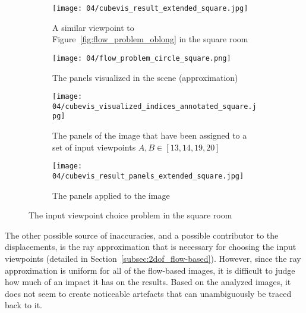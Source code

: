 \begin{figure}[p]
\centering
    \hfill
    \begin{subfigure}[c]{0.45\textwidth}
            \centering
            \texttt{[image: 04/cubevis\_result\_extended\_square.jpg]}
            \caption{A similar viewpoint to Figure~\ref{fig:flow_problem_oblong} in the square room}
    \end{subfigure}
    \hfill
    \begin{subfigure}[c]{0.45\textwidth}
            \centering
            \texttt{[image: 04/flow\_problem\_circle\_square.png]}
            \caption{The panels visualized in the scene (approximation)}
    \end{subfigure}
    \hfill

    \hfill
    \begin{subfigure}[c]{0.45\textwidth}
            \centering
            \texttt{[image: 04/cubevis\_visualized\_indices\_annotated\_square.jpg]}
            \caption{The panels of the image that have been assigned to a set of input viewpoints $A, B \in [13, 14, 19, 20]$}
    \end{subfigure}
    \hfill
    \begin{subfigure}[c]{0.45\textwidth}
            \centering
            \texttt{[image: 04/cubevis\_result\_panels\_extended\_square.jpg]}
            \caption{The panels applied to the image}
    \end{subfigure}
    \hfill
  \caption{The input viewpoint choice problem in the square room}
  \label{fig:flow_problem_square}
\end{figure}

The other possible source of inaccuracies, and a possible contributor to the displacements, is the ray approximation that is necessary for choosing the input viewpoints (detailed in Section~\ref{subsec:2dof_flow-based}). However, since the ray approximation is uniform for all of the flow-based images, it is difficult to judge how much of an impact it has on the results. Based on the analyzed images, it does not seem to create noticeable artefacts that can unambiguously be traced back to it.



















